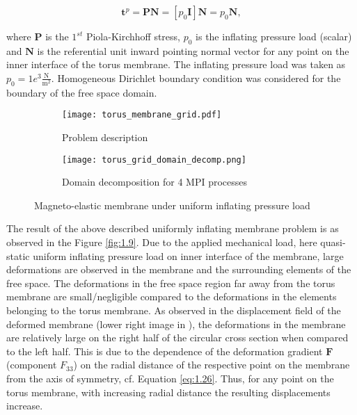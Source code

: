 \begin{equation}
\mathbf{t}^p = \mathbf{P}\mathbf{N} = \left[ p_0 \mathbf{I} \right] \mathbf{N} = p_0 \mathbf{N},
\end{equation}

\noindent where $\mathbf{P}$ is the $1^{st}$ Piola-Kirchhoff stress, $p_0$ is the inflating pressure load (scalar) and $\mathbf{N}$ is the referential unit inward pointing normal vector for any point on the inner interface of the torus membrane. The inflating pressure load was taken as $p_0 = 1e^{3} \frac{\text{N}}{\text{m}^2}$. Homogeneous Dirichlet boundary condition was considered for the boundary of the free space domain.\par 

\begin{figure}[h]
\centering 
\begin{subfigure}[b]{0.6\textwidth}
\centering
\texttt{[image: torus\_membrane\_grid.pdf]}
\caption{\scriptsize{Problem description}}
\label{fig:1.7.1}
\end{subfigure}
\begin{subfigure}[b]{0.39\textwidth}
\centering
\texttt{[image: torus\_grid\_domain\_decomp.png]}
\caption{\scriptsize{Domain decomposition for 4 MPI processes}}
\label{fig:1.7.2}
\end{subfigure}
\caption{Magneto-elastic membrane under uniform inflating pressure load}
\label{fig:1.7}
\end{figure} 

The result of the above described uniformly inflating membrane problem is as observed in the Figure \eqref{fig:1.9}. Due to the applied mechanical load, here quasi-static uniform inflating pressure load on inner interface of the membrane, large deformations are observed in the membrane and the surrounding elements of the free space. The deformations in the free space region far away from the torus membrane are small/negligible compared to the deformations in the elements belonging to the torus membrane. As observed in the displacement field of the deformed membrane (lower right image in ), the deformations in the membrane are relatively large on the right half of the circular cross section when compared to the left half. This is due to the dependence of the deformation gradient $\mathbf{F}$ (component $F_{33}$) on the radial distance of the respective point on the membrane from the axis of symmetry, cf. Equation \eqref{eq:1.26}. Thus, for any point on the torus membrane, with increasing radial distance the resulting displacements increase. \par  

